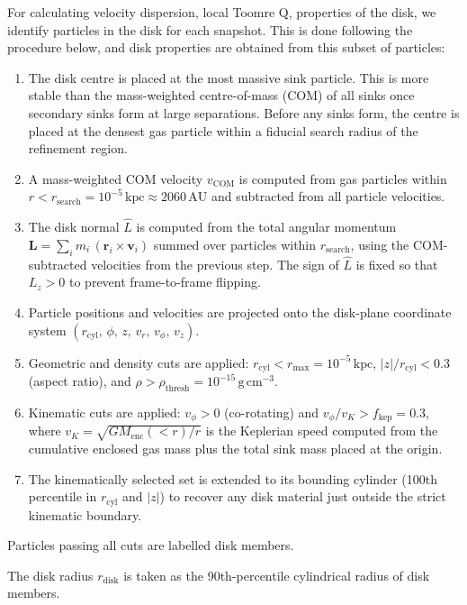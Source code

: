 \documentclass[twocolumn,11pt]{article}
\newcommand{\AU}{\,\mathrm{AU}}
\newcommand{\kpc}{\,\mathrm{kpc}}
\newcommand{\gcm}{\,\mathrm{g\,cm^{-3}}}
\newcommand{\Lhat}{\hat{L}}
\newcommand{\rdisk}{r_\mathrm{disk}}
\begin{document}
For calculating velocity dispersion, local Toomre Q, properties of the disk, we
identify particles in the disk for each snapshot.
This is done following the procedure below, and disk properties are obtained from
this subset of particles:
\begin{enumerate}
  \item The disk centre is placed at the most massive sink
    particle. This is more stable than the mass-weighted
    centre-of-mass (COM) of all sinks once secondary sinks form
    at large separations. Before any sinks form, the centre is
    placed at the densest gas particle within a fiducial search
    radius of the refinement region.
  \item A mass-weighted COM velocity
    $v_\mathrm{COM}$ is computed from gas particles within
    $r < r_\mathrm{search} = 10^{-5}\kpc \approx 2060\AU$ and
    subtracted from all particle velocities.
  \item The disk normal $\Lhat$ is computed from the
    total angular momentum
    $\mathbf{L} = \sum_i m_i\,(\mathbf{r}_i \times \mathbf{v}_i)$
    summed over particles within $r_\mathrm{search}$, using the
    COM-subtracted velocities from the previous step. The sign
    of $\Lhat$ is fixed so that $L_z > 0$ to prevent
    frame-to-frame flipping.
  \item Particle positions and velocities are projected onto the
    disk-plane coordinate system
    $(r_\mathrm{cyl},\,\phi,\,z,\,v_r,\,v_\phi,\,v_z)$.
  \item Geometric and density cuts are applied:
    $r_\mathrm{cyl} < r_\mathrm{max} = 10^{-5}\kpc$,
    $|z|/r_\mathrm{cyl} < 0.3$ (aspect ratio), and
    $\rho > \rho_\mathrm{thresh} = 10^{-15}\gcm$.
  \item Kinematic cuts are applied:
    $v_\phi > 0$ (co-rotating) and
    $v_\phi / v_K > f_\mathrm{kep} = 0.3$, where
    $v_K = \sqrt{G M_\mathrm{enc}(<r)/r}$ is the Keplerian speed
    computed from the cumulative enclosed gas mass plus the total
    sink mass placed at the origin.
  \item The kinematically selected set is extended to its bounding
    cylinder (100th percentile in $r_\mathrm{cyl}$ and $|z|$) to
    recover any disk material just outside the strict kinematic
    boundary.
\end{enumerate}
Particles passing all cuts are labelled disk members.

The disk radius $\rdisk$ is taken as the 90th-percentile cylindrical radius
of disk members.
\end{document}
